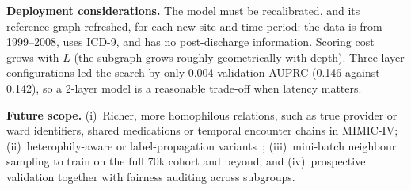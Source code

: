 \documentclass[conference]{IEEEtran}
\begin{document}
\textbf{Deployment considerations.} The model must be recalibrated, and its reference graph
refreshed, for each new site and time period: the data is from 1999--2008, uses ICD-9, and has
no post-discharge information. Scoring cost grows with $L$ (the subgraph grows roughly geometrically with depth). Three-layer
configurations led the search by only 0.004 validation AUPRC (0.146 against 0.142), so a
2-layer model is a reasonable trade-off when latency matters.

\textbf{Future scope.} (i)~Richer, more homophilous relations, such as true provider or ward
identifiers, shared medications or temporal encounter chains in MIMIC-IV; (ii)~heterophily-aware
or label-propagation variants~\cite{zhu2020}; (iii)~mini-batch neighbour sampling to train on the
full 70k cohort and beyond; and (iv)~prospective validation together with fairness auditing across
subgroups.
\end{document}
